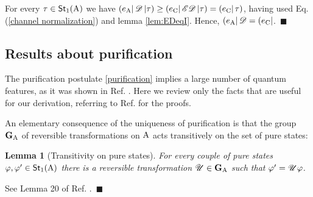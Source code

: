 \documentclass[12pt,aps,pra,showpacs,groupedaddress]{revtex4-1}
\newtheorem{lemma}{Lemma} \newtheorem{proposition}{Proposition}
\newtheorem{definition}{Definition}
\def\Proof{\medskip\par\noindent{\bf Proof. }}
\def\qed{$\,\blacksquare$\par}
\def\rC{{\rm C}}
\def\Stset{{\mathsf{St}}}
\def\Trnset{{\mathsf{Transf}}}
\def\grp#1{{\mathbf{#1}}} \def\Span{\mathsf{Span}}
\def\K#1{\left|#1\right)}  \def\B#1{\left(#1\right|}
\def\SC#1#2{\left(#1\right|\left.\!#2\right)}  \def\Tr{{\rm Tr}}
\begin{document}
\Proof For every $\tau\in\Stset_1(\rA)$ we have $\B {e_\rA} \tD \K \tau \ge \B {e_\rC} \tE \tD \K
\tau = \SC{e_\rC} \tau$, having used Eq. (\ref{channel normalization}) and lemma \ref{lem:EDeqI}.
Hence, $\B {e_\rA} \tD = \B {e_\rC} $. \qed


   

\subsection{Results about purification}

The purification postulate \ref{purification} implies a large number of quantum features, as it was
shown in Ref. \cite{purification}.  Here we review only the facts that are useful for our
derivation, referring to Ref. \cite{purification} for the proofs.


An elementary consequence of the uniqueness of purification is that the group $\grp G_\rA$ of
reversible transformations on ${\rm A}$ acts transitively on the set of pure states:
\begin{lemma}[Transitivity on pure states]\label{lem:trans}
  For every couple of pure states $\varphi, \varphi' \in\Stset_1 (\rA)$ there is a reversible
  transformation $\tU \in\grp G_\rA$ such that $\varphi' = \mathscr U \varphi$.
\end{lemma} 
\Proof See Lemma 20 of Ref. \cite{purification}.  \qed 
\end{document}
